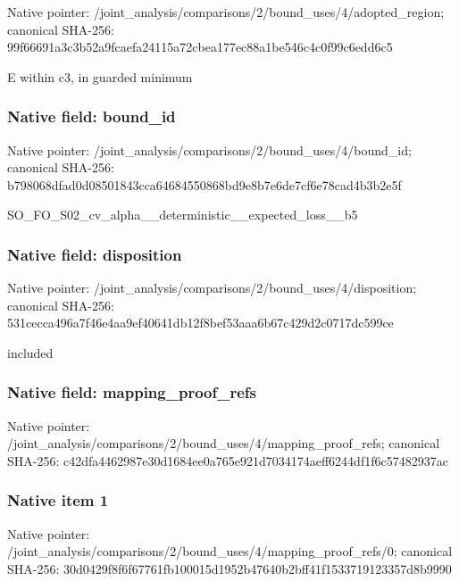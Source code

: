 \documentclass[10pt,a4paper]{article}
\begin{document}
Native pointer: /joint\_analysis/comparis\allowbreak{}ons/2/bound\_uses/4/adopt\allowbreak{}ed\_region; canonical SHA-256: 99f66691a3c3b52a9fcaefa2\allowbreak{}4115a72cbea177ec88a1be54\allowbreak{}6c4c0f99c6edd6c5


E within c3, in guarded minimum


\subsubsection{Native field: bound\_id}


Native pointer: /joint\_analysis/comparis\allowbreak{}ons/2/bound\_uses/4/bound\allowbreak{}\_id; canonical SHA-256: b798068dfad0d08501843cca\allowbreak{}64684550868bd9e8b7e6de7c\allowbreak{}f6e78cad4b3b2e5f


SO\_FO\_S02\_cv\_alpha\_\_dete\allowbreak{}rministic\_\_expected\_loss\allowbreak{}\_\_b5


\subsubsection{Native field: disposition}


Native pointer: /joint\_analysis/comparis\allowbreak{}ons/2/bound\_uses/4/dispo\allowbreak{}sition; canonical SHA-256: 531cecca496a7f46e4aa9ef4\allowbreak{}0641db12f8bef53aaa6b67c4\allowbreak{}29d2c0717dc599ce


included


\subsubsection{Native field: mapping\_proof\_refs}


Native pointer: /joint\_analysis/comparis\allowbreak{}ons/2/bound\_uses/4/mappi\allowbreak{}ng\_proof\_refs; canonical SHA-256: c42dfa4462987e30d1684ee0\allowbreak{}a765e921d7034174aeff6244\allowbreak{}df1f6c57482937ac



\subsubsection{Native item 1}


Native pointer: /joint\_analysis/comparis\allowbreak{}ons/2/bound\_uses/4/mappi\allowbreak{}ng\_proof\_refs/0; canonical SHA-256: 30d0429f8f6f67761fb10001\allowbreak{}5d1952b47640b2bff41f1533\allowbreak{}719123357d8b9990
\end{document}
